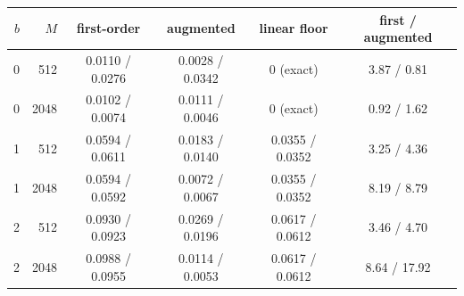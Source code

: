 \begin{tabular}{@{}r r c c c c@{}}
\toprule
$b$ & $M$ & first-order & augmented & linear floor & first / augmented \\
\midrule
0 & 512 & 0.0110 / 0.0276 & 0.0028 / 0.0342 & 0 (exact) & 3.87 / 0.81 \\
0 & 2048 & 0.0102 / 0.0074 & 0.0111 / 0.0046 & 0 (exact) & 0.92 / 1.62 \\
1 & 512 & 0.0594 / 0.0611 & 0.0183 / 0.0140 & 0.0355 / 0.0352 & 3.25 / 4.36 \\
1 & 2048 & 0.0594 / 0.0592 & 0.0072 / 0.0067 & 0.0355 / 0.0352 & 8.19 / 8.79 \\
2 & 512 & 0.0930 / 0.0923 & 0.0269 / 0.0196 & 0.0617 / 0.0612 & 3.46 / 4.70 \\
2 & 2048 & 0.0988 / 0.0955 & 0.0114 / 0.0053 & 0.0617 / 0.0612 & 8.64 / 17.92 \\
\bottomrule
\end{tabular}
